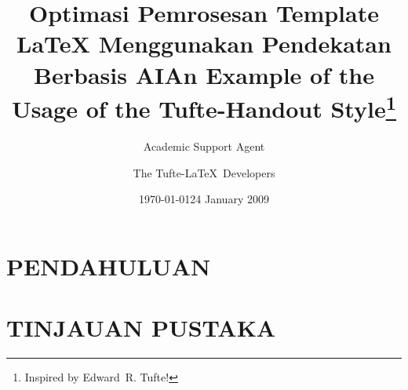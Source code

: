 \documentclass{tufte-handout}
\title{Optimasi Pemrosesan Template LaTeX Menggunakan Pendekatan Berbasis AI}
\author{Academic Support Agent}
\date{\today}
\begin{document}
\maketitle

\begin{abstract}

\end{abstract}

\chapter{PENDAHULUAN}


\chapter{TINJAUAN PUSTAKA}




\usepackage{amsmath}

\usepackage{graphicx}
\graphicspath{{graphics/}}

\title{An Example of the Usage of the Tufte-Handout Style\thanks{Inspired by Edward~R. Tufte!}}
\author[The Tufte-LaTeX Developers]{The Tufte-\LaTeX\ Developers}
\date{24 January 2009}  %

\usepackage{booktabs}

\usepackage{units}

\usepackage{fancyvrb}

\usepackage{multicol}

\usepackage{lipsum}

\newcommand{\doccmd}[1]{\texttt{\textbackslash#1}}%
\newcommand{\docopt}[1]{\ensuremath{\langle}\textrm{\textit{#1}}\ensuremath{\rangle}}%
\newcommand{\docarg}[1]{\textrm{\textit{#1}}}%
\newenvironment{docspec}{\begin{quote}\noindent}{\end{quote}}%
\newcommand{\docenv}[1]{\textsf{#1}}%
\newcommand{\docpkg}[1]{\texttt{#1}}%
\newcommand{\doccls}[1]{\texttt{#1}}%
\newcommand{\docclsopt}[1]{\texttt{#1}}%
\end{document}

